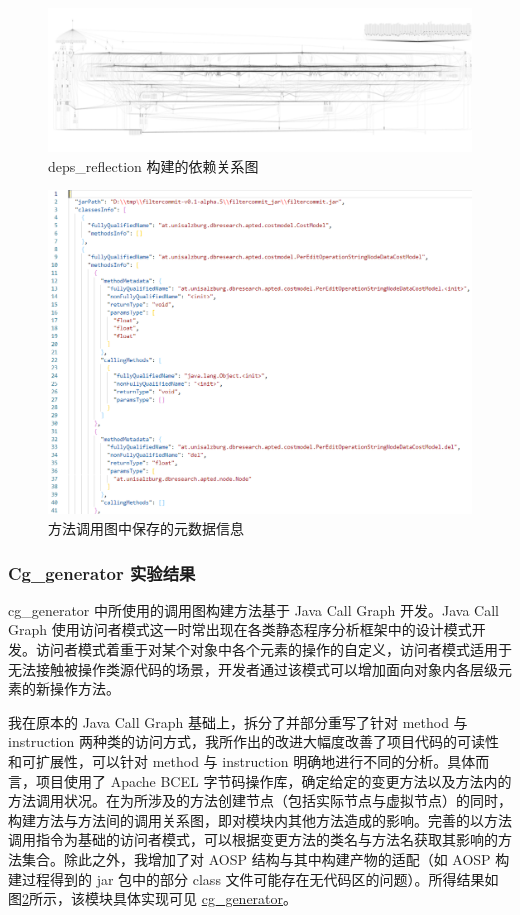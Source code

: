 \begin{figure}[htb]
    \centering
    \includegraphics[width=.9\textwidth]{figures/design-view.png}
    \caption{deps\_reflection 构建的依赖关系图}
    \label{fig:design-deps-reflection}
\end{figure}

\begin{figure}[htb]
    \centering
    \includegraphics[width=.6\textwidth]{figures/design-cg-generator.png}
    \caption{方法调用图中保存的元数据信息}
    \label{fig:design-cg-generator}
\end{figure}

\subsubsection{Cg\_generator 实验结果}

cg\_generator 中所使用的调用图构建方法基于 Java Call Graph 开发。Java Call Graph 使用访问者模式这一时常出现在各类静态程序分析框架中的设计模式开发。访问者模式着重于对某个对象中各个元素的操作的自定义，访问者模式适用于无法接触被操作类源代码的场景，开发者通过该模式可以增加面向对象内各层级元素的新操作方法\cite{gamma1994design}。

我在原本的 Java Call Graph 基础上，拆分了并部分重写了针对 method 与 instruction 两种类的访问方式，我所作出的改进大幅度改善了项目代码的可读性和可扩展性，可以针对 method 与 instruction 明确地进行不同的分析。具体而言，项目使用了 Apache BCEL 字节码操作库，确定给定的变更方法以及方法内的方法调用状况。在为所涉及的方法创建节点（包括实际节点与虚拟节点）的同时，构建方法与方法间的调用关系图，即对模块内其他方法造成的影响。完善的以方法调用指令为基础的访问者模式，可以根据变更方法的类名与方法名获取其影响的方法集合。除此之外，我增加了对 AOSP 结构与其中构建产物的适配（如 AOSP 构建过程得到的 jar 包中的部分 class 文件可能存在无代码区的问题）。所得结果如图\ref{fig:design-cg-generator}所示，该模块具体实现可见 \href{https://github.com/AOSPworking/cg_generator}{cg\_generator}。

